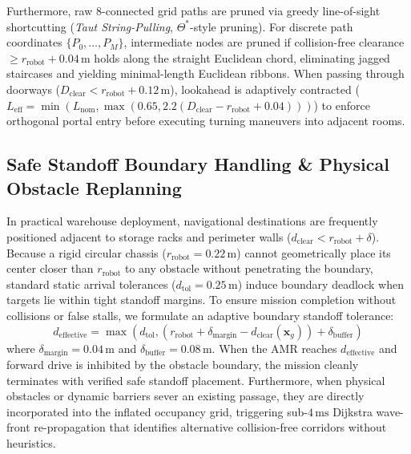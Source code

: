 \documentclass[runningheads]{llncs}
\begin{document}
Furthermore, raw 8-connected grid paths are pruned via greedy line-of-sight shortcutting (\textit{Taut String-Pulling}, $\Theta^*$-style pruning). For discrete path coordinates $\{P_0, \dots, P_M\}$, intermediate nodes are pruned if collision-free clearance $\ge r_{\text{robot}} + 0.04\,\text{m}$ holds along the straight Euclidean chord, eliminating jagged staircases and yielding minimal-length Euclidean ribbons. When passing through doorways ($D_{\text{clear}} < r_{\text{robot}} + 0.12\,\text{m}$), lookahead is adaptively contracted ($L_{\text{eff}} = \min(L_{\text{nom}}, \max(0.65, 2.2(D_{\text{clear}} - r_{\text{robot}} + 0.04)))$) to enforce orthogonal portal entry before executing turning maneuvers into adjacent rooms.

\subsection{Safe Standoff Boundary Handling \& Physical Obstacle Replanning}
In practical warehouse deployment, navigational destinations are frequently positioned adjacent to storage racks and perimeter walls ($d_{\text{clear}} < r_{\text{robot}} + \delta$). Because a rigid circular chassis ($r_{\text{robot}} = 0.22\,\text{m}$) cannot geometrically place its center closer than $r_{\text{robot}}$ to any obstacle without penetrating the boundary, standard static arrival tolerances ($d_{\text{tol}} = 0.25\,\text{m}$) induce boundary deadlock when targets lie within tight standoff margins. To ensure mission completion without collisions or false stalls, we formulate an adaptive boundary standoff tolerance:
\begin{equation}
d_{\text{effective}} = \max\left(d_{\text{tol}}, \left(r_{\text{robot}} + \delta_{\text{margin}} - d_{\text{clear}}(\mathbf{x}_g)\right) + \delta_{\text{buffer}}\right)
\end{equation}
where $\delta_{\text{margin}} = 0.04\,\text{m}$ and $\delta_{\text{buffer}} = 0.08\,\text{m}$. When the AMR reaches $d_{\text{effective}}$ and forward drive is inhibited by the obstacle boundary, the mission cleanly terminates with verified safe standoff placement. Furthermore, when physical obstacles or dynamic barriers sever an existing passage, they are directly incorporated into the inflated occupancy grid, triggering sub-$4\,\text{ms}$ Dijkstra wave-front re-propagation that identifies alternative collision-free corridors without heuristics.
\end{document}
